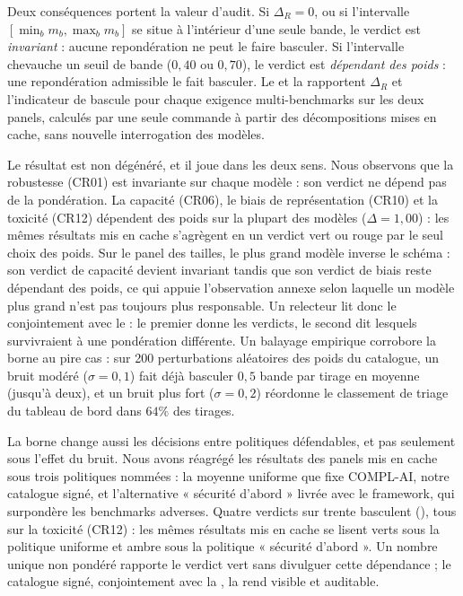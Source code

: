 \documentclass[10pt,conference]{IEEEtran}
\begin{document}
Deux conséquences portent la valeur d'audit.
Si $\Delta_R=0$, ou si l'intervalle $[\min_b m_b,\max_b m_b]$ se situe à l'intérieur d'une seule bande, le verdict est \emph{invariant} : aucune repondération ne peut le faire basculer.
Si l'intervalle chevauche un seuil de bande ($0{,}40$ ou $0{,}70$), le verdict est \emph{dépendant des poids} : une repondération admissible le fait basculer.
Le  et la  rapportent $\Delta_R$ et l'indicateur de bascule pour chaque exigence multi-benchmarks sur les deux panels, calculés par une seule commande à partir des décompositions mises en cache, sans nouvelle interrogation des modèles.

Le résultat est non dégénéré, et il joue dans les deux sens.
Nous observons que la robustesse (CR01) est invariante sur chaque modèle : son verdict ne dépend pas de la pondération.
La capacité (CR06), le biais de représentation (CR10) et la toxicité (CR12) dépendent des poids sur la plupart des modèles ($\Delta{=}1{,}00$) : les mêmes résultats mis en cache s'agrègent en un verdict vert ou rouge par le seul choix des poids.
Sur le panel des tailles, le plus grand modèle inverse le schéma : son verdict de capacité devient invariant tandis que son verdict de biais reste dépendant des poids, ce qui appuie l'observation annexe selon laquelle un modèle plus grand n'est pas toujours plus responsable.
Un relecteur lit donc le  conjointement avec le  : le premier donne les verdicts, le second dit lesquels survivraient à une pondération différente.
Un balayage empirique corrobore la borne au pire cas : sur 200 perturbations aléatoires des poids du catalogue, un bruit modéré ($\sigma{=}0{,}1$) fait déjà basculer $0{,}5$ bande par tirage en moyenne (jusqu'à deux), et un bruit plus fort ($\sigma{=}0{,}2$) réordonne le classement de triage du tableau de bord dans $64\%$ des tirages.

La borne change aussi les décisions entre politiques défendables, et pas seulement sous l'effet du bruit.
Nous avons réagrégé les résultats des panels mis en cache sous trois politiques nommées : la moyenne uniforme que fixe COMPL-AI, notre catalogue signé, et l'alternative « sécurité d'abord » livrée avec le framework, qui surpondère les benchmarks adverses.
Quatre verdicts sur trente basculent (), tous sur la toxicité (CR12) : les mêmes résultats mis en cache se lisent verts sous la politique uniforme et ambre sous la politique « sécurité d'abord ».
Un nombre unique non pondéré rapporte le verdict vert sans divulguer cette dépendance ; le catalogue signé, conjointement avec la , la rend visible et auditable.
\end{document}
